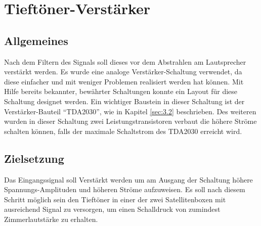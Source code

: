 \null\newpage
\section{Tieftöner-Verstärker}\label{sec:5.3}
\subsection{Allgemeines}\label{subsec:5.3.1}
Nach dem Filtern des Signals soll dieses vor dem Abstrahlen am Lautsprecher verstärkt werden. Es wurde eine analoge Verstärker-Schaltung verwendet, da diese einfacher und mit weniger Problemen realisiert werden hat können. Mit Hilfe bereits bekannter, bewährter Schaltungen konnte ein Layout für diese Schaltung designet werden. Ein wichtiger Baustein in dieser Schaltung ist der Verstärker-Bauteil \enquote{TDA2030}, wie in Kapitel \ref{sec:3.2} beschrieben.  Des weiteren wurden in dieser Schaltung zwei Leistungstransistoren verbaut die höhere Ströme schalten können, falls der maximale Schaltstrom des TDA2030 erreicht wird.

\subsection{Zielsetzung}\label{subsec:5.3.2}
Das Eingangssignal soll Verstärkt werden um am Ausgang der Schaltung höhere Spannungs-Amplituden und höheren Ströme aufzuweisen. Es soll nach diesem Schritt möglich sein den Tieftöner in einer der zwei Satellitenboxen mit ausreichend Signal zu versorgen, um einen Schalldruck von zumindest Zimmerlautstärke zu erhalten. 

